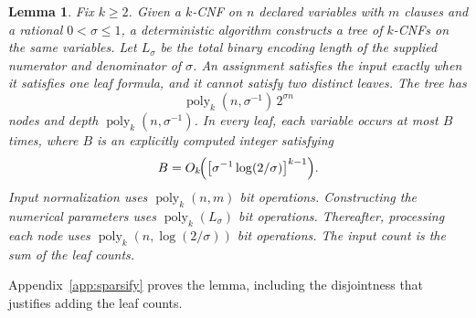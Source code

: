 \documentclass[11pt,reqno]{amsart}
\numberwithin{equation}{section}
\newtheorem{lemma}[theorem]{Lemma}
\theoremstyle{definition}\newtheorem{definition}[theorem]{Definition}
\theoremstyle{remark}\newtheorem{remark}[theorem]{Remark}
\newcommand{\poly}{\operatorname{poly}}
\renewcommand{\le}{\leqslant}
\renewcommand{\ge}{\geqslant}
\begin{document}
\begin{lemma}\label{lem:sparsify}
Fix $k\ge2$. Given a $k$-CNF on $n$ declared variables with $m$
clauses and a rational $0<\sigma\le1$, a deterministic algorithm
constructs a tree of $k$-CNFs on the same variables. Let $L_\sigma$
be the total binary encoding length of the supplied numerator and
denominator of $\sigma$.
An assignment satisfies the input exactly when it satisfies one
leaf formula, and it cannot satisfy two distinct leaves.
The tree has
\[
 \operatorname{poly}_k(n,\sigma^{-1})\,2^{\sigma n}
\]
nodes and depth $\poly_k(n,\sigma^{-1})$.
In every leaf, each variable occurs at most $B$ times, where $B$
is an explicitly computed integer satisfying
\[
 B=O_k\!\Bigl(\bigl[\sigma^{-1}\log(2/\sigma)\bigr]^{k-1}\Bigr).
\]
Input normalization uses $\poly_k(n,m)$ bit operations.
Constructing the numerical parameters uses $\poly_k(L_\sigma)$
bit operations. Thereafter, processing each node uses
$\poly_k(n,\log(2/\sigma))$ bit operations.
The input count is the sum of the leaf counts.
\end{lemma}
Appendix~\ref{app:sparsify} proves the lemma, including the
disjointness that justifies adding the leaf counts.
\end{document}
